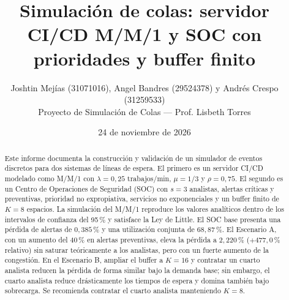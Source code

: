 \title{\textbf{Simulación de colas: servidor CI/CD M/M/1 y SOC con\\ prioridades y buffer finito}}
\author{Joshtin Mejías (31071016), Angel Bandres (29524378) y Andrés Crespo (31259533)\\[0.2em]
\small Proyecto de Simulación de Colas --- Prof. Lisbeth Torres}
\date{24 de noviembre de 2026}
\maketitle
\thispagestyle{empty}

\begin{abstract}
\noindent
Este informe documenta la construcción y validación de un simulador de eventos
discretos para dos sistemas de líneas de espera. El primero es un servidor
CI/CD modelado como M/M/1 con $\lambda=0{,}25$ trabajos/min, $\mu=1/3$ y
$\rho=0{,}75$. El segundo es un Centro de Operaciones de Seguridad (SOC) con
$s=3$ analistas, alertas críticas y preventivas, prioridad no expropiativa,
servicios no exponenciales y un buffer finito de $K=8$ espacios. La simulación
del M/M/1 reproduce los valores analíticos dentro de los intervalos de confianza
del 95\,\% y satisface la Ley de Little. El SOC base presenta una pérdida de
alertas de $0{,}385$\,\% y una utilización conjunta de $68{,}87$\,\%. El
Escenario A, con un aumento del $40$\,\% en alertas preventivas, eleva la
pérdida a $2{,}220$\,\% ($+477{,}0$\,\% relativo) sin saturar teóricamente a los
analistas, pero con un fuerte aumento de la congestión. En el Escenario B,
ampliar el buffer a $K=16$ y contratar un cuarto analista reducen la pérdida de
forma similar bajo la demanda base; sin embargo, el cuarto analista reduce
drásticamente los tiempos de espera y domina también bajo sobrecarga. Se
recomienda contratar el cuarto analista manteniendo $K=8$.
\end{abstract}
